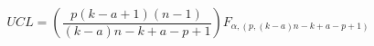 

\[
UCL = \left( \frac{p(k - a + 1)(n-1)}{(k - a)n - k + a - p + 1} \right) F_{\alpha,(p,(k-a)n-k+a-p+1)}
\]



